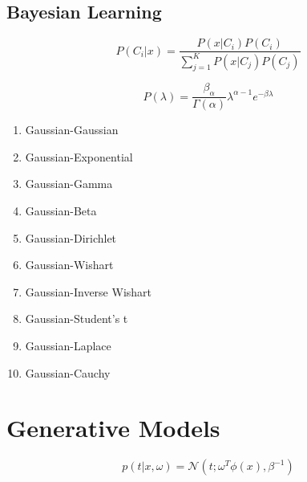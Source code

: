 \documentclass[10pt]{article}
\begin{document}
\begin{multicols}{2}

\subsection*{Bayesian Learning}
\begin{equation*}
    P(C_i | x) = \frac{P(x | C_i)P(C_i)}{\sum_{j=1}^{K} P(x | C_j)P(C_j)}
\end{equation*}

\begin{equation*}
    P(\lambda) = \frac{\beta_{\alpha}}{\Gamma(\alpha)} \lambda^{\alpha - 1} e^{-\beta \lambda}
\end{equation*}


\begin{enumerate}
    \item Gaussian-Gaussian
    \vspace*{-8pt}
    \item Gaussian-Exponential
    \vspace*{-8pt}
    \item Gaussian-Gamma
    \vspace*{-8pt}
    \item Gaussian-Beta
    \vspace*{-8pt}
    \item Gaussian-Dirichlet
    \vspace*{-8pt}
    \item Gaussian-Wishart
    \vspace*{-8pt}
    \item Gaussian-Inverse Wishart
    \vspace*{-8pt}
    \item Gaussian-Student's t
    \vspace*{-8pt}
    \item Gaussian-Laplace
    \vspace*{-8pt}
    \item Gaussian-Cauchy
\end{enumerate}

\section*{Generative Models}

\begin{equation}
    \label{eq:generative}
    p(t | x, \omega) = \mathcal{N}(t ; \omega^{T}\phi(x), \beta^{-1})
\end{equation}


\end{multicols}
\end{document}
